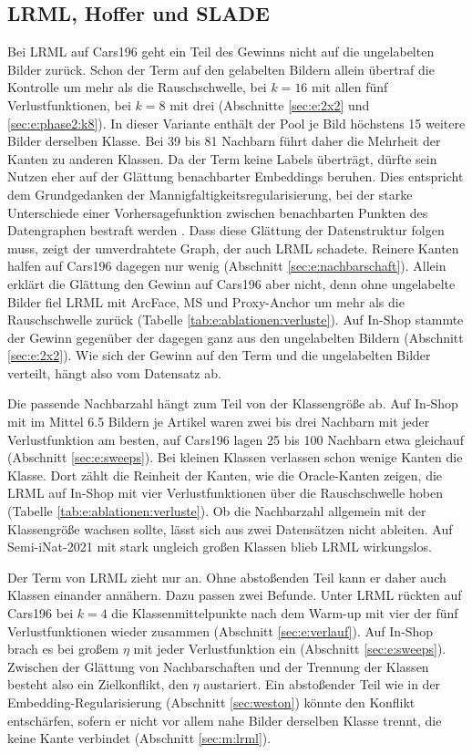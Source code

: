 \subsection{\acs{LRML}, Hoffer und \acs{SLADE}}
\label{sec:d:weitere}

Bei \ac{LRML} auf Cars196 geht ein Teil des Gewinns nicht auf die ungelabelten Bilder zurück. Schon der Term auf den gelabelten Bildern allein übertraf die Kontrolle um mehr als die Rauschschwelle, bei $k=16$ mit allen fünf Verlustfunktionen, bei $k=8$ mit drei (Abschnitte \ref{sec:e:2x2} und \ref{sec:e:phase2:k8}). In dieser Variante enthält der Pool je Bild höchstens 15 weitere Bilder derselben Klasse. Bei 39 bis 81 Nachbarn führt daher die Mehrheit der Kanten zu anderen Klassen. Da der Term keine Labels überträgt, dürfte sein Nutzen eher auf der Glättung benachbarter Embeddings beruhen. Dies entspricht dem Grundgedanken der Mannigfaltigkeitsregularisierung, bei der starke Unterschiede einer Vorhersagefunktion zwischen benachbarten Punkten des Datengraphen bestraft werden \cite{belkin_manifold_2006}. Dass diese Glättung der Datenstruktur folgen muss, zeigt der umverdrahtete Graph, der auch \ac{LRML} schadete. Reinere Kanten halfen auf Cars196 dagegen nur wenig (Abschnitt \ref{sec:e:nachbarschaft}). Allein erklärt die Glättung den Gewinn auf Cars196 aber nicht, denn ohne ungelabelte Bilder fiel \ac{LRML} mit ArcFace, \ac{MS} und Proxy-Anchor um mehr als die Rauschschwelle zurück (Tabelle \ref{tab:e:ablationen:verluste}). Auf In-Shop stammte der Gewinn gegenüber der \UEBL dagegen ganz aus den ungelabelten Bildern (Abschnitt \ref{sec:e:2x2}). Wie sich der Gewinn auf den Term und die ungelabelten Bilder verteilt, hängt also vom Datensatz ab.

Die passende Nachbarzahl hängt zum Teil von der Klassengröße ab. Auf In-Shop mit im Mittel \num{6.5} Bildern je Artikel waren zwei bis drei Nachbarn mit jeder Verlustfunktion am besten, auf Cars196 lagen 25 bis 100 Nachbarn etwa gleichauf (Abschnitt \ref{sec:e:sweeps}). Bei kleinen Klassen verlassen schon wenige Kanten die Klasse. Dort zählt die Reinheit der Kanten, wie die Oracle-Kanten zeigen, die \ac{LRML} auf In-Shop mit vier Verlustfunktionen über die Rauschschwelle hoben (Tabelle \ref{tab:e:ablationen:verluste}). Ob die Nachbarzahl allgemein mit der Klassengröße wachsen sollte, lässt sich aus zwei Datensätzen nicht ableiten. Auf Semi-iNat-2021 mit stark ungleich großen Klassen blieb \ac{LRML} wirkungslos. 

Der Term von \ac{LRML} zieht nur an. Ohne abstoßenden Teil kann er daher auch Klassen einander annähern. Dazu passen zwei Befunde. Unter \ac{LRML} rückten auf Cars196 bei $k=4$ die Klassenmittelpunkte nach dem Warm-up mit vier der fünf Verlustfunktionen wieder zusammen (Abschnitt \ref{sec:e:verlauf}). Auf In-Shop brach es bei großem $\eta$ mit jeder Verlustfunktion ein (Abschnitt \ref{sec:e:sweeps}). Zwischen der Glättung von Nachbarschaften und der Trennung der Klassen besteht also ein Zielkonflikt, den $\eta$ austariert. Ein abstoßender Teil wie in der Embedding-Regularisierung (Abschnitt \ref{sec:weston}) könnte den Konflikt entschärfen, sofern er nicht vor allem nahe Bilder derselben Klasse trennt, die keine Kante verbindet (Abschnitt \ref{sec:m:lrml}).

